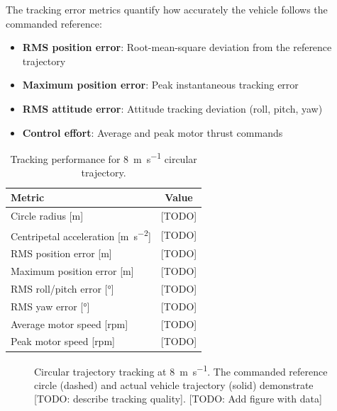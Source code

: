 The tracking error metrics quantify how accurately the vehicle follows the commanded reference:

\begin{itemize}
  \item \textbf{RMS position error}: Root-mean-square deviation from the reference trajectory
  \item \textbf{Maximum position error}: Peak instantaneous tracking error
  \item \textbf{RMS attitude error}: Attitude tracking deviation (roll, pitch, yaw)
  \item \textbf{Control effort}: Average and peak motor thrust commands
\end{itemize}

\begin{table}[htbp]
\centering
\caption{Tracking performance for \SI{8}{\meter\per\second} circular trajectory.}
\label{tab:circle_tracking_performance}
\begin{tabular}{lc}
\hline
\textbf{Metric} & \textbf{Value} \\
\hline
Circle radius [\si{\meter}] & [TODO] \\
Centripetal acceleration [\si{\meter\per\second\squared}] & [TODO] \\
RMS position error [\si{\meter}] & [TODO] \\
Maximum position error [\si{\meter}] & [TODO] \\
RMS roll/pitch error [\si{\degree}] & [TODO] \\
RMS yaw error [\si{\degree}] & [TODO] \\
Average motor speed [\si{rpm}] & [TODO] \\
Peak motor speed [\si{rpm}] & [TODO] \\
\hline
\end{tabular}
\end{table}

\begin{figure}[htbp]
  \centering
  \caption{Circular trajectory tracking at \SI{8}{\meter\per\second}. The commanded reference circle (dashed) and actual vehicle trajectory (solid) demonstrate [TODO: describe tracking quality]. [TODO: Add figure with data]}
  \label{fig:circle_trajectory_8mps}
\end{figure}

